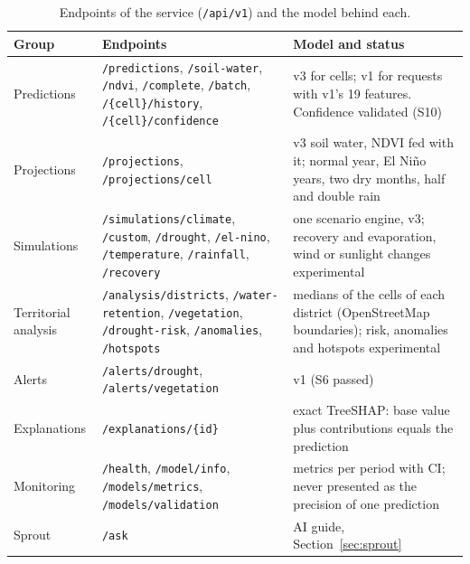 \documentclass[11pt,a4paper]{article}
\begin{document}
\begin{table}[H]
\centering\small
\caption{Endpoints of the service (\texttt{/api/v1}) and the model behind each.}
\label{tab:api}
\begin{tabularx}{\textwidth}{>{\raggedright\arraybackslash}p{3.0cm}>{\raggedright\arraybackslash}p{5.6cm}X}
\toprule
Group & Endpoints & Model and status \\
\midrule
Predictions & \texttt{/predictions}, \texttt{/soil-water}, \texttt{/ndvi}, \texttt{/complete}, \texttt{/batch}, \texttt{/\{cell\}/history}, \texttt{/\{cell\}/confidence} & v3 for cells; v1 for requests with v1's 19 features. Confidence validated (S10) \\
Projections & \texttt{/projections}, \texttt{/projections/cell} & v3 soil water, NDVI fed with it; normal year, El Ni\~no years, two dry months, half and double rain \\
Simulations & \texttt{/simulations/climate}, \texttt{/custom}, \texttt{/drought}, \texttt{/el-nino}, \texttt{/temperature}, \texttt{/rainfall}, \texttt{/recovery} & one scenario engine, v3; recovery and evaporation, wind or sunlight changes experimental \\
Territorial analysis & \texttt{/analysis/districts}, \texttt{/water-retention}, \texttt{/vegetation}, \texttt{/drought-risk}, \texttt{/anomalies}, \texttt{/hotspots} & medians of the cells of each district (OpenStreetMap boundaries); risk, anomalies and hotspots experimental \\
Alerts & \texttt{/alerts/drought}, \texttt{/alerts/vegetation} & v1 (S6 passed) \\
Explanations & \texttt{/explanations/\{id\}} & exact TreeSHAP: base value plus contributions equals the prediction \\
Monitoring & \texttt{/health}, \texttt{/model/info}, \texttt{/models/metrics}, \texttt{/models/validation} & metrics per period with CI; never presented as the precision of one prediction \\
Sprout & \texttt{/ask} & AI guide, Section~\ref{sec:sprout} \\
\bottomrule
\end{tabularx}
\end{table}
\end{document}
